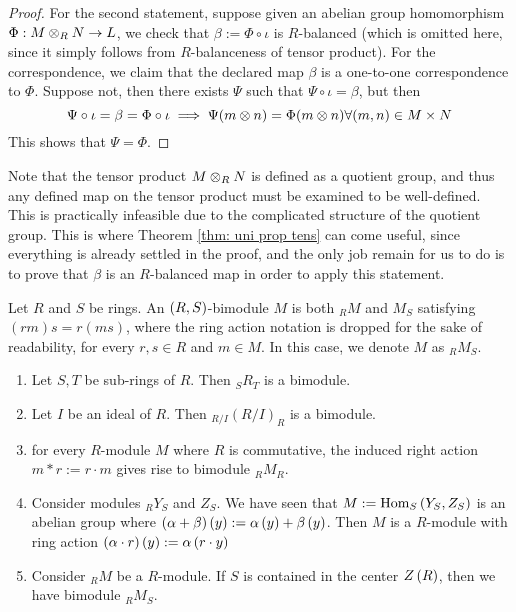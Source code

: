 \begin{proof}
    For the second statement, suppose given an abelian group homomorphism $\Phi:M\otimes_R N\to L$, we check that $\beta:= \Phi\circ \iota$ is $R$-balanced (which is omitted here, since it simply follows from $R$-balanceness of tensor product). For the correspondence, we claim that the declared map $\beta$ is a one-to-one correspondence to $\Phi$. Suppose not, then there exists $\Psi$ such that $\Psi \circ \iota = \beta$, but then
    \[\Psi \circ \iota = \beta = \Phi \circ \iota \implies \Psi(m\otimes n) = \Phi(m\otimes n) \forall (m,n)\in M\times N\]
    This shows that $\Psi = \Phi$.
\end{proof}

\begin{re}
    Note that the tensor product $M\otimes_R N$ is defined as a quotient group, and thus any defined map on the tensor product must be examined to be well-defined. This is practically infeasible due to the complicated structure of the quotient group. This is where Theorem \ref{thm: uni prop tens} can come useful, since everything is already settled in the proof, and the only job remain for us to do is to prove that $\beta$ is an $R$-balanced map in order to apply this statement.
\end{re}

\medskip

\begin{defn} [Bimodule]
    Let $R$ and $S$ be rings. An $\left(R,S\right)$-bimodule $M$ is both $_RM$ and $M_S$ satisfying $(rm)s = r(ms)$, where the ring action notation is dropped for the sake of readability, for every $r,s\in R$ and $m\in M$. In this case, we denote $M$ as $_RM_S$.
\end{defn}

\medskip

\begin{ex}
    \hfill
    \begin{enumerate}
        \item Let $S, T$ be sub-rings of $R$. Then $_SR_T$ is a bimodule.
        \item Let $I$ be an ideal of $R$. Then $_{R/I}(R/I)_R$ is a bimodule.
        \item for every $R$-module $M$ where $R$ is commutative, the induced right action $m*r:= r\cdot m$ gives rise to bimodule $_RM_R$.
        \item Consider modules $_RY_S$ and $Z_S$. We have seen that $M:=\operatorname{Hom}_S\left(Y_S, Z_S\right)$ is an abelian group where $\left(\alpha + \beta\right) \left(y\right):= \alpha \left(y\right) + \beta \left(y\right)$. Then $M$ is a $R$-module with ring action $(\alpha\cdot r) \left(y\right):= \alpha \left(r\cdot y\right)$ 
        \item Consider $_RM$ be a $R$-module. If $S$ is contained in the center $Z \left(R\right)$, then we have bimodule $_RM_S$.
    \end{enumerate}
\end{ex}

